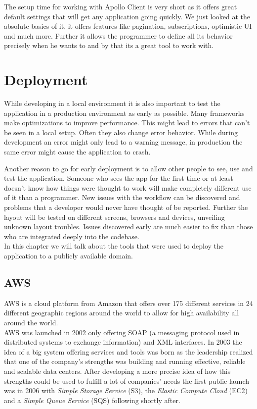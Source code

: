 The setup time for working with Apollo Client is very short as it offers great default settings that will get any application going quickly. We just looked at the absolute basics of it, it offers features like pagination, subscriptions, optimistic UI and much more.
Further it allows the programmer to define all its behavior precisely when he wants to and by that its a great tool to work with.

\chapter{Deployment}
While developing in a local environment it is also important to test the application in a production environment as early as possible. Many frameworks make optimizations to improve performance. This might lead to errors that can't be seen in a local setup. Often they also change error behavior. While during development an error might only lead to a warning message, in production the same error might cause the application to crash.

Another reason to go for early deployment is to allow other people to see, use and test the application. Someone who sees the app for the first time or at least doesn't know how things were thought to work will make completely different use of it than a programmer. New issues with the workflow can be discovered and problems that a developer would never have thought of be reported. Further the layout will be tested on different screens, browsers and devices, unveiling unknown layout troubles. Issues discovered early are much easier to fix than those who are integrated deeply into the codebase. \\

In this chapter we will talk about the tools that were used to deploy the application to a publicly available domain.

\section{AWS}
AWS is a cloud platform from Amazon that offers over 175 different services in 24 different geographic regions around the world to allow for high availability all around the world. \cite{WhatIsAws}\\
AWS was launched in 2002 only offering SOAP (a messaging protocol used in distributed systems to exchange information) and XML interfaces. \cite{HistoryAwsMedia} In 2003 the idea of a big system offering services and tools was born as the leadership realized that one of the company's strengths was building and running effective, reliable and scalable data centers. After developing a more precise idea of how this strengths could be used to fulfill a lot of companies' needs the first public launch was in 2006 with \emph{Simple Storage Service} (S3), the \emph{Elastic Compute Cloud} (EC2) and a \emph{Simple Queue Service} (SQS) following shortly after. \cite{HistoryAwsTech}

